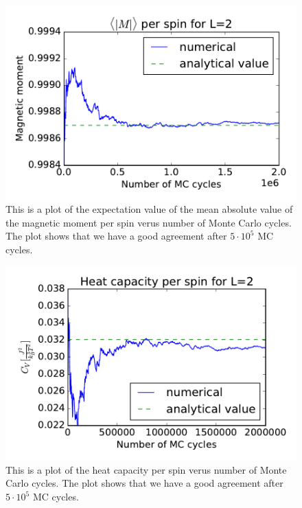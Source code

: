 \begin{figure}[H]
\includegraphics[width=\linewidth]{../results/4b/L_2_magnetic_abs}\caption{This is a plot of the expectation value of the mean absolute value of the magnetic moment per spin verus number of Monte Carlo cycles. The plot shows that we have a good agreement after $ 5 \cdot 10^{5} $ MC cycles.}\label{fig:L_2_magnetic_abs}
\end{figure}

\begin{figure}[H]
\includegraphics[width=\linewidth]{../results/4b/L_2_heat_capasity}\caption{This is a plot of the heat capacity per spin verus number of Monte Carlo cycles. The plot shows that we have a good agreement after $ 5 \cdot 10^{5} $ MC cycles.}\label{fig:L_2_heat_capacity}
\end{figure}

